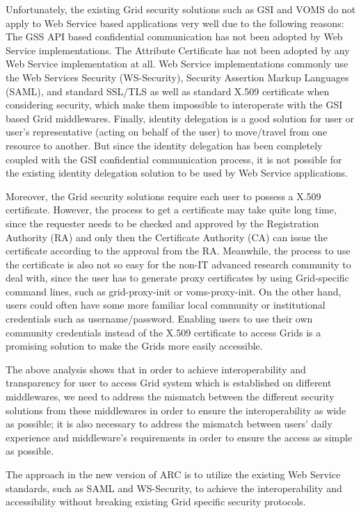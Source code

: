 Unfortunately, the existing Grid security solutions such as GSI and VOMS do not apply to Web Service based applications very well due to the following reasons:
The GSS API based confidential communication has not been adopted by Web Service implementations.
The Attribute Certificate has not been adopted by any Web Service implementation at all.
Web Service implementations commonly use the Web Services Security (WS-Security)\cite{WSSeclink}, Security Assertion Markup Languages (SAML)\cite{SAMLlink}, and standard SSL/TLS as well as standard X.509 certificate when considering security, which make them impossible to interoperate with the GSI based Grid middlewares.
Finally, identity delegation is a good solution for user or user’s representative (acting on behalf of the user) to move/travel from one resource to another. But since the identity delegation has been completely coupled with the GSI confidential communication process, it is not possible for the existing identity delegation solution to be used by Web Service applications.

Moreover, the Grid security solutions require each user to possess a X.509 certificate. However, the process to get a certificate may take quite long time, since the requester needs to be checked and approved by the Registration Authority (RA) and only then the Certificate Authority (CA) can issue the certificate according to the approval from the RA. Meanwhile, the process to use the certificate is also not so easy for the non-IT advanced research community to deal with, since the user has to generate proxy certificates by using Grid-specific command lines, such as grid-proxy-init or voms-proxy-init. On the other hand, users could often have some more familiar local community or institutional credentials such as username/password. Enabling users to use their own community credentials instead of the X.509 certificate to access Grids is a promising solution to make the Grids more easily accessible.

The above analysis shows that in order to achieve interoperability and transparency for user to access Grid system which is established on different middlewares, we need to address the mismatch between the different security solutions from these middlewares in order to ensure the interoperability as wide as possible; it is also necessary to address the mismatch between users’ daily experience and middleware’s requirements in order to ensure the access as simple as possible.

The approach in the new version of ARC is to utilize the existing Web Service standards, such as SAML and WS-Security, to achieve the interoperability and accessibility without breaking existing Grid specific security protocols.

